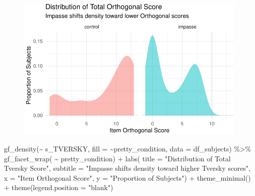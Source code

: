 \documentclass[
  letterpaper,
  DIV=11,
  numbers=noendperiod]{scrreprt}
\newenvironment{Shaded}{\begin{snugshade}}{\end{snugshade}}
\newcommand{\AttributeTok}[1]{\textcolor[rgb]{0.40,0.45,0.13}{#1}}
\newcommand{\FunctionTok}[1]{\textcolor[rgb]{0.28,0.35,0.67}{#1}}
\newcommand{\NormalTok}[1]{\textcolor[rgb]{0.00,0.23,0.31}{#1}}
\newcommand{\SpecialCharTok}[1]{\textcolor[rgb]{0.37,0.37,0.37}{#1}}
\newcommand{\StringTok}[1]{\textcolor[rgb]{0.13,0.47,0.30}{#1}}
\begin{document}
\begin{figure}[H]

{\centering \includegraphics{analysis/SGC3A/2_sgc3A_scoring_files/figure-pdf/DIST-SUBSCORES-2.pdf}

}

\end{figure}

\begin{Shaded}
\begin{Highlighting}[]
\FunctionTok{gf\_density}\NormalTok{(}\SpecialCharTok{\textasciitilde{}}\NormalTok{ s\_TVERSKY, }\AttributeTok{fill =} \SpecialCharTok{\textasciitilde{}}\NormalTok{pretty\_condition, }\AttributeTok{data =}\NormalTok{ df\_subjects) }\SpecialCharTok{\%\textgreater{}\%} 
  \FunctionTok{gf\_facet\_wrap}\NormalTok{( }\SpecialCharTok{\textasciitilde{}}\NormalTok{ pretty\_condition) }\SpecialCharTok{+} 
  \FunctionTok{labs}\NormalTok{( }\AttributeTok{title =} \StringTok{"Distribution of Total Tversky Score"}\NormalTok{,}
        \AttributeTok{subtitle =} \StringTok{"Impasse shifts density toward higher Tversky scores"}\NormalTok{,}
        \AttributeTok{x =} \StringTok{"Item Orthogonal Score"}\NormalTok{, }\AttributeTok{y =} \StringTok{"Proportion of Subjects"}\NormalTok{) }\SpecialCharTok{+} 
        \FunctionTok{theme\_minimal}\NormalTok{() }\SpecialCharTok{+} \FunctionTok{theme}\NormalTok{(}\AttributeTok{legend.position =} \StringTok{"blank"}\NormalTok{)}
\end{Highlighting}
\end{Shaded}
\end{document}
